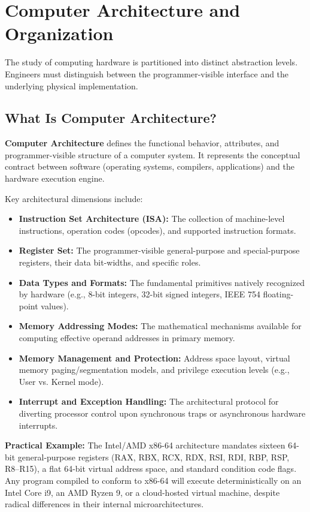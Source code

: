 \section{Computer Architecture and Organization}
\label{sec:arch_and_org}

The study of computing hardware is partitioned into distinct abstraction levels. Engineers must distinguish between the programmer-visible interface and the underlying physical implementation.

\subsection{What Is Computer Architecture?}
\textbf{Computer Architecture} defines the functional behavior, attributes, and programmer-visible structure of a computer system. It represents the conceptual contract between software (operating systems, compilers, applications) and the hardware execution engine.

Key architectural dimensions include:
\begin{itemize}
    \item \textbf{Instruction Set Architecture (ISA):} The collection of machine-level instructions, operation codes (opcodes), and supported instruction formats.
    \item \textbf{Register Set:} The programmer-visible general-purpose and special-purpose registers, their data bit-widths, and specific roles.
    \item \textbf{Data Types and Formats:} The fundamental primitives natively recognized by hardware (e.g., 8-bit integers, 32-bit signed integers, IEEE 754 floating-point values).
    \item \textbf{Memory Addressing Modes:} The mathematical mechanisms available for computing effective operand addresses in primary memory.
    \item \textbf{Memory Management and Protection:} Address space layout, virtual memory paging/segmentation models, and privilege execution levels (e.g., User vs. Kernel mode).
    \item \textbf{Interrupt and Exception Handling:} The architectural protocol for diverting processor control upon synchronous traps or asynchronous hardware interrupts.
\end{itemize}

\textbf{Practical Example:} The Intel/AMD x86-64 architecture mandates sixteen 64-bit general-purpose registers (RAX, RBX, RCX, RDX, RSI, RDI, RBP, RSP, R8--R15), a flat 64-bit virtual address space, and standard condition code flags. Any program compiled to conform to x86-64 will execute deterministically on an Intel Core i9, an AMD Ryzen 9, or a cloud-hosted virtual machine, despite radical differences in their internal microarchitectures.

